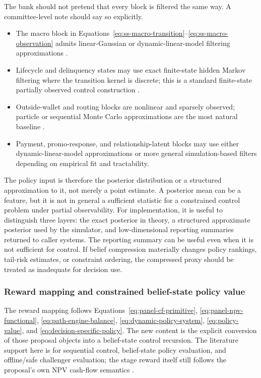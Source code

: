 \documentclass[11pt]{article}
\newcommand{\1}{\mathbf{1}}
\begin{document}
The bank should not pretend that every block is filtered the same way. A
committee-level note should say so explicitly.
\begin{itemize}[leftmargin=*]
  \item The macro block in Equations~\eqref{eq:ss-macro-transition}--\eqref{eq:ss-macro-observation}
        admits linear-Gaussian or dynamic-linear-model filtering approximations
        \citep{durbinkoopman2012ssm,westharrison1997bfdm}.
  \item Lifecycle and delinquency states may use exact finite-state hidden
        Markov filtering where the transition kernel is discrete; this is a
        standard finite-state partially observed control construction
        \citep{smallwood1973pomdp,kaelbling1998pomdp}.
  \item Outside-wallet and routing blocks are nonlinear and sparsely observed;
        particle or sequential Monte Carlo approximations are the most natural
        baseline \citep{doucet2001smc}.
  \item Payment, promo-response, and relationship-latent blocks may use either
        dynamic-linear-model approximations or more general simulation-based
        filters depending on empirical fit and tractability.
\end{itemize}

The policy input is therefore the posterior distribution or a structured
approximation to it, not merely a point estimate. A posterior mean can be a
feature, but it is not in general a sufficient statistic for a constrained
control problem under partial observability.
For implementation, it is useful to distinguish three layers: the exact
posterior in theory, a structured approximate posterior used by the simulator,
and low-dimensional reporting summaries returned to caller systems. The
reporting summary can be useful even when it is not sufficient for control. If
belief compression materially changes policy rankings, tail-risk estimates, or
constraint ordering, the compressed proxy should be treated as inadequate for
decision use.

\subsubsection{Reward mapping and constrained belief-state policy value}
\label{subsec:state-space-reward-bellman}

The reward mapping follows Equations~\eqref{eq:panel-cf-primitive},
\eqref{eq:panel-npv-functional}, \eqref{eq:path-engine-balance},
\eqref{eq:dynamic-policy-system}, \eqref{eq:policy-value}, and
\eqref{eq:decision-specific-policy}. The new content is the explicit conversion
of those proposal objects into a belief-state control recursion. The literature
support here is for sequential control, belief-state policy evaluation, and
offline/safe challenger evaluation; the stage reward itself still follows the
proposal's own NPV cash-flow semantics
\citep{puterman1994mdp,murphy2003dynamic,smallwood1973pomdp,
kaelbling1998pomdp,jiangli2016dr,huwager2021pomdpope,laroche2019spibb,
khraishiokhrati2022offlinecredit}.
\end{document}

